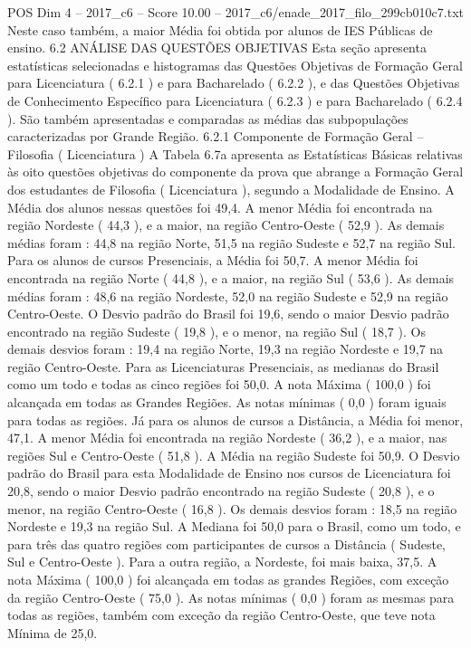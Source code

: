 \begin{textsample}{POS Dim 4 – 2017\_c6 – Score 10.00 – 2017\_c6/enade\_2017\_filo\_299cb010c7.txt}
Neste caso também, a maior Média foi obtida por alunos de IES Públicas de ensino. 6.2 ANÁLISE DAS QUESTÕES OBJETIVAS Esta seção apresenta estatísticas selecionadas e histogramas das Questões Objetivas de Formação Geral para Licenciatura ( 6.2.1 ) e para Bacharelado ( 6.2.2 ), e das Questões Objetivas de Conhecimento Específico para Licenciatura ( 6.2.3 ) e para Bacharelado ( 6.2.4 ).
São também apresentadas e comparadas as médias das subpopulações caracterizadas por Grande Região. 6.2.1 Componente de Formação Geral – Filosofia ( Licenciatura ) A Tabela 6.7a apresenta as Estatísticas Básicas relativas às oito questões objetivas do componente da prova que abrange a Formação Geral dos estudantes de Filosofia ( Licenciatura ), segundo a Modalidade de Ensino.
A Média dos alunos nessas questões foi 49,4.
A menor Média foi encontrada na região Nordeste ( 44,3 ), e a maior, na região Centro-Oeste ( 52,9 ).
As demais médias foram : 44,8 na região Norte, 51,5 na região Sudeste e 52,7 na região Sul.
Para os alunos de cursos Presenciais, a Média foi 50,7.
A menor Média foi encontrada na região Norte ( 44,8 ), e a maior, na região Sul ( 53,6 ).
As demais médias foram : 48,6 na região Nordeste, 52,0 na região Sudeste e 52,9 na região Centro-Oeste.
O Desvio padrão do Brasil foi 19,6, sendo o maior Desvio padrão encontrado na região Sudeste ( 19,8 ), e o menor, na região Sul ( 18,7 ).
Os demais desvios foram : 19,4 na região Norte, 19,3 na região Nordeste e 19,7 na região Centro-Oeste.
Para as Licenciaturas Presenciais, as medianas do Brasil como um todo e todas as cinco regiões foi 50,0.
A nota Máxima ( 100,0 ) foi alcançada em todas as Grandes Regiões.
As notas mínimas ( 0,0 ) foram iguais para todas as regiões.
Já para os alunos de cursos a Distância, a Média foi menor, 47,1.
A menor Média foi encontrada na região Nordeste ( 36,2 ), e a maior, nas regiões Sul e Centro-Oeste ( 51,8 ).
A Média na região Sudeste foi 50,9.
O Desvio padrão do Brasil para esta Modalidade de Ensino nos cursos de Licenciatura foi 20,8, sendo o maior Desvio padrão encontrado na região Sudeste ( 20,8 ), e o menor, na região Centro-Oeste ( 16,8 ).
Os demais desvios foram : 18,5 na região Nordeste e 19,3 na região Sul.
A Mediana foi 50,0 para o Brasil, como um todo, e para três das quatro regiões com participantes de cursos a Distância ( Sudeste, Sul e Centro-Oeste ).
Para a outra região, a Nordeste, foi mais baixa, 37,5.
A nota Máxima ( 100,0 ) foi alcançada em todas as grandes Regiões, com exceção da região Centro-Oeste ( 75,0 ).
As notas mínimas ( 0,0 ) foram as mesmas para todas as regiões, também com exceção da região Centro-Oeste, que teve nota Mínima de 25,0.

\end{textsample}
